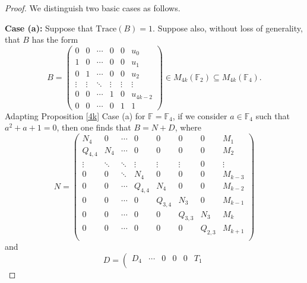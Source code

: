 \documentclass{amsart}
\def\FF{\mathbb{F}}
\theoremstyle{definition}
\theoremstyle{remark}
\numberwithin{equation}{section}
\begin{document}
\begin{proof} We distinguish two basic cases as follows.

\medskip

{\bf Case (a):} Suppose that $\text{Trace}(B)=1$. Suppose also, without loss of generality, that $B$ has the form
$$
B=\left(\begin{array}{cccccc}
                                                                          0 & 0 & \cdots & 0 & 0 &u_0\\
                                                                          1 & 0 & \cdots & 0 & 0 &u_1\\
                                                                          0 & 1 & \cdots & 0 & 0 &u_2\\
                                                                          \vdots & \vdots & \ddots & \vdots & \vdots &\vdots\\
                                                                          0 & 0 & \cdots & 1 & 0 &u_{4k-2}\\
                                                                          0 & 0 & \cdots & 0 & 1 &1
                                                                        \end{array}\right)\in M_{4k}(\FF_2)\subseteq M_{4k}(\FF_4).$$
Adapting Proposition \ref{4k} Case (a) for $\FF=\FF_4$, if we consider $a\in \FF_4$ such that $a^2+a+1=0$, then one finds that $B=N+D$, where
$$N=\left(
      \begin{array}{cccccccc}
        N_4  & 0 &\cdots & 0& 0 & 0 & 0&  M_1 \\
        Q_{4,4}  &N_4 & \cdots & 0 & 0 & 0& 0  & M_2 \\
        \vdots &\ddots & \ddots & \vdots& \vdots & \vdots& 0  & \vdots \\
        0 &0 & \ddots & N_4 & 0& 0 & 0&  M_{k-3} \\
        0 &0 & \cdots & Q_{4,4} & N_4& 0& 0 &  M_{k-2} \\
        0 &0 & \cdots & 0 & Q_{3,4}& N_3& 0 &  M_{k-1} \\
        0 &0 & \cdots & 0 & 0& Q_{3,3} &N_3&   M_k \\
        0 &0 & \cdots & 0 &0 & 0& Q_{2,3} &  M_{k+1} \\
      \end{array}
    \right)
$$
\noindent and
$$
D=\left(
         \begin{array}{cccccc}
           D_4 & \cdots & 0 & 0 & 0 & T_1 \\

\end{array}$$
\end{proof}
\end{document}
